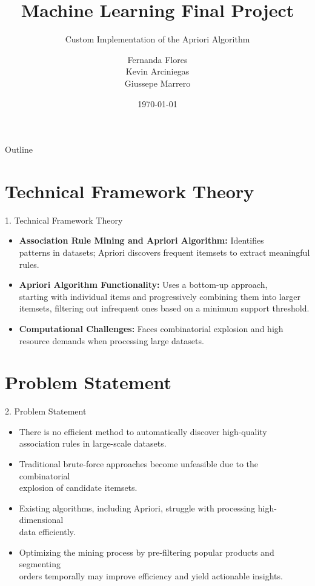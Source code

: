 \documentclass{beamer}
\title{Machine Learning Final Project}
\subtitle{Custom Implementation of the Apriori Algorithm}
\author{
\begin{tabular}{c} 
Fernanda Flores \\ 
Kevin Arciniegas \\ 
Giussepe Marrero
\end{tabular}
}
\institute{4Geeks Academy}
\date{\today}
\begin{document}
\begin{frame}
    \titlepage
\end{frame}

\begin{frame}{Outline}
    \tableofcontents
\end{frame}

\section{Technical Framework Theory}

\begin{frame}{1. Technical Framework Theory}
    \begin{itemize}
        \item \textbf{Association Rule Mining and Apriori Algorithm:} Identifies \\
              patterns in datasets; Apriori discovers frequent itemsets to extract meaningful rules.
        \item \textbf{Apriori Algorithm Functionality:} Uses a bottom-up approach, \\
              starting with individual items and progressively combining them into larger\\
              itemsets, filtering out infrequent ones based on a minimum support threshold.
        \item \textbf{Computational Challenges:} Faces combinatorial explosion and high \\
              resource demands when processing large datasets.
    \end{itemize}
\end{frame}

\section{Problem Statement}

\begin{frame}{2. Problem Statement}
    \begin{itemize}
        \item There is no efficient method to automatically discover high-quality \\
              association rules in large-scale datasets.
        \item Traditional brute-force approaches become unfeasible due to the combinatorial \\
              explosion of candidate itemsets.
        \item Existing algorithms, including Apriori, struggle with processing high-dimensional\\
              data efficiently.
        \item Optimizing the mining process by pre-filtering popular products and segmenting \\
              orders temporally may improve efficiency and yield actionable insights.
    \end{itemize}
\end{frame}
\end{document}
